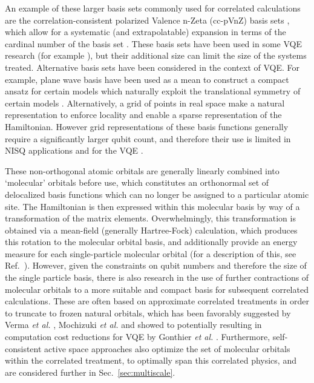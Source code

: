 An example of these larger basis sets commonly used for correlated calculations are the correlation-consistent polarized Valence n-Zeta (cc-pVnZ) basis sets \cite{Dunning1989}, which allow for a systematic (and extrapolatable) expansion in terms of the cardinal number of the basis set \cite{Varandas2000}. These basis sets have been used in some VQE research (for example \cite{Kuhn2019, Kottmann2021_1, Tilly2021}), but their additional size can limit the size of the systems treated. Alternative basis sets have been considered in the context of VQE. For example, plane wave basis have been used as a mean to construct a compact ansatz for certain models which naturally exploit the translational symmetry of certain models \cite{Babbush2018}. Alternatively, a grid of points in real space make a natural representation to enforce locality and enable a sparse representation of the Hamiltonian. However grid representations of these basis functions generally require a significantly larger qubit count, and therefore their use is limited in NISQ applications and for the VQE \cite{mcardleQuantumComputationalChemistry2018,Wiesner1996, Zalka1998, Lidar1999, Kassal2008, Ward2009, Jones2012, Kivlichan2017}.

These non-orthogonal atomic orbitals are generally linearly combined into `molecular' orbitals before use, which constitutes an orthonormal set of delocalized basis functions which can no longer be assigned to a particular atomic site. The Hamiltonian is then expressed within this molecular basis by way of a transformation of the matrix elements. Overwhelmingly, this transformation is obtained via a mean-field (generally Hartree-Fock) calculation, which produces this rotation to the molecular orbital basis, and additionally provide an energy measure for each single-particle molecular orbital (for a description of this, see Ref.~\cite{Jensen2017}). However, given the constraints on qubit numbers and therefore the size of the single particle basis, there is also research in the use of further contractions of molecular orbitals to a more suitable and compact basis for subsequent correlated calculations. These are often based on approximate correlated treatments in order to truncate to frozen natural orbitals, which has been favorably suggested by Verma \textit{et al.} \cite{Verma2021}, Mochizuki \textit{et al.} \cite{Mochizuki2019} and showed to potentially resulting in computation cost reductions for VQE by Gonthier \textit{et al.} \cite{Gonthier2020}. Furthermore, self-consistent active space approaches also optimize the set of molecular orbitals within the correlated treatment, to optimally span this correlated physics, and are considered further in Sec.~\ref{sec:multiscale}.

